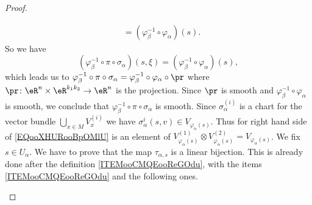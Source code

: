 \begin{proof}
\begin{subproof}
\begin{subequations}
\begin{align}
				                                                   & =(\varphi_{\beta}^{-1}\circ\varphi_{\alpha})(s).
			\end{align}
		\end{subequations}
		So we have
		\begin{equation}
			(\varphi_{\beta}^{-1}\circ\pi\circ\sigma_{\alpha})(s,\xi)=(\varphi_{\beta}^{-1}\circ\varphi_{\alpha})(s),
		\end{equation}
		which leads us to \( \varphi_{\beta}^{-1}\circ\pi\circ\sigma_{\alpha}=\varphi_{\beta}^{-1}\circ\varphi_{\alpha}\circ\pr\) where \(\pr \colon \eR^n\times \eR^{k_1k_2}\to \eR^n  \) is the projection. Since \( \pr\) is smooth and \( \varphi_{\beta}^{-1}\circ\varphi_{\alpha}\) is smooth, we conclude that \( \varphi_{\beta}^{-1}\circ\pi\circ\sigma_{\alpha}\) is smooth.
		Since \( \sigma_{\alpha}^{(i)}\) is a chart for the vector bundle \( \bigcup_{x\in M}V_x^{(i)}\) we have \( \sigma_{\alpha}^{i}(s,v)\in V_{\varphi_{\alpha}(s)}\). Thus for right hand side of \eqref{EQooXHURooBpOMlU} is an element of \( V_{\varphi_{\alpha}(s)}^{(1)}\otimes V_{\varphi_{\alpha}(s)}^{(2)}=V_{\varphi_{\alpha}(s)}\).
		We fix \( s\in U_{\alpha}\). We have to prove that the map \( \tau_{\alpha,s}\) is a linear bijection. This is already done after the definition \eqref{ITEMooCMQEooReGOdu}, with the items \ref{ITEMooCMQEooReGOdu} and the following ones.


\end{subproof}
\end{proof}
